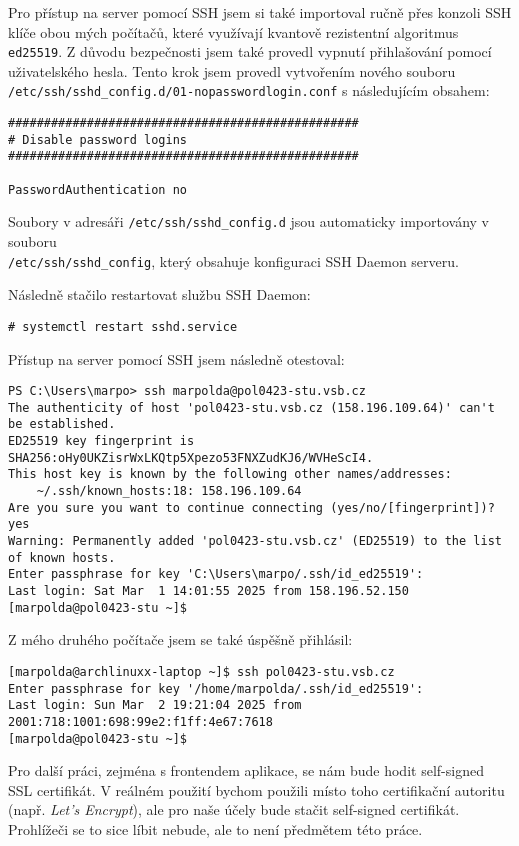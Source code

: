 Pro přístup na server pomocí SSH jsem si také importoval ručně
přes konzoli SSH klíče obou mých počítačů, které využívají kvantově
rezistentní algoritmus \texttt{ed25519}. Z důvodu bezpečnosti jsem
také provedl vypnutí přihlašování pomocí uživatelského hesla.
Tento krok jsem provedl vytvořením nového souboru
\texttt{/etc/ssh/sshd\_config.d/01-nopasswordlogin.conf}
s následujícím obsahem:

\begin{verbatim}
#################################################
# Disable password logins
#################################################

PasswordAuthentication no
\end{verbatim}

Soubory v adresáři \texttt{/etc/ssh/sshd\_config.d} jsou automaticky
importovány v souboru\\
\texttt{/etc/ssh/sshd\_config}, který obsahuje konfiguraci SSH Daemon
serveru.

Následně stačilo restartovat službu SSH Daemon:

\begin{verbatim}
# systemctl restart sshd.service
\end{verbatim}

Přístup na server pomocí SSH jsem následně otestoval:
\begin{verbatim}
PS C:\Users\marpo> ssh marpolda@pol0423-stu.vsb.cz
The authenticity of host 'pol0423-stu.vsb.cz (158.196.109.64)' can't be established.
ED25519 key fingerprint is SHA256:oHy0UKZisrWxLKQtp5Xpezo53FNXZudKJ6/WVHeScI4.
This host key is known by the following other names/addresses:
    ~/.ssh/known_hosts:18: 158.196.109.64
Are you sure you want to continue connecting (yes/no/[fingerprint])? yes
Warning: Permanently added 'pol0423-stu.vsb.cz' (ED25519) to the list of known hosts.
Enter passphrase for key 'C:\Users\marpo/.ssh/id_ed25519':
Last login: Sat Mar  1 14:01:55 2025 from 158.196.52.150
[marpolda@pol0423-stu ~]$
\end{verbatim}

Z mého druhého počítače jsem se také úspěšně přihlásil:
\begin{verbatim}
[marpolda@archlinuxx-laptop ~]$ ssh pol0423-stu.vsb.cz
Enter passphrase for key '/home/marpolda/.ssh/id_ed25519':
Last login: Sun Mar  2 19:21:04 2025 from 2001:718:1001:698:99e2:f1ff:4e67:7618
[marpolda@pol0423-stu ~]$
\end{verbatim}

Pro další práci, zejména s frontendem aplikace, se nám
bude hodit self-signed SSL certifikát. V reálném použití
bychom použili místo toho certifikační autoritu (např.
\emph{Let's Encrypt}), ale pro naše účely bude stačit
self-signed certifikát. Prohlížeči se to sice líbit
nebude, ale to není předmětem této práce.

